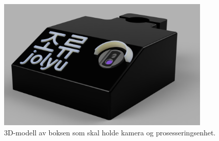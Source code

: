 \begin{figure}[!htbp]
\centering
\begin{minipage}[c]{0.45\textwidth}
\centering
    \includegraphics[width=0.9\textwidth]{implementering/Boks_render.png}
    \caption{3D-modell av boksen som skal holde kamera og prosesseringsenhet.}
    \label{fig:boks}
    

\end{minipage}
\end{figure}
